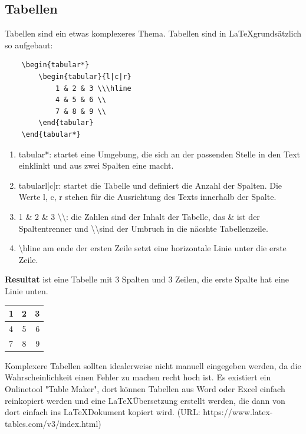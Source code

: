 \documentclass{article}
\begin{document}
\subsection{Tabellen}

Tabellen sind ein etwas komplexeres Thema. Tabellen sind in \LaTeX grundsätzlich so aufgebaut:

\begin{lstlisting}
    \begin{tabular*}
        \begin{tabular}{l|c|r}
            1 & 2 & 3 \\\hline
            4 & 5 & 6 \\
            7 & 8 & 9 \\
        \end{tabular}
    \end{tabular*}
\end{lstlisting}

\begin{enumerate}
    \item {tabular*}: startet eine Umgebung, die sich an der passenden Stelle in den Text einklinkt und aus zwei Spalten eine macht.
    \item {tabular}{l|c|r}: startet die Tabelle und definiert die Anzahl der Spalten. Die Werte l, c, r stehen für die Ausrichtung des Texts innerhalb der Spalte.
    \item 1 \& 2 \& 3 \textbackslash\textbackslash: die Zahlen sind der Inhalt der Tabelle, das \& ist der Spaltentrenner und \textbackslash\textbackslash sind der Umbruch in die näcshte Tabellenzeile.
    \item \textbackslash hline am ende der ersten Zeile setzt eine horizontale Linie unter die erste Zeile.
\end{enumerate}

\textbf{Resultat} ist eine Tabelle mit 3 Spalten und 3 Zeilen, die erste Spalte hat eine Linie unten.  

\vspace{1cm}
    \begin{tabular}{l|c|r}
        1 & 2 & 3 \\\hline
        4 & 5 & 6 \\
        7 & 8 & 9 \\
    \end{tabular}
\vspace{1cm}

Komplexere Tabellen sollten idealerweise nicht manuell eingegeben werden, da die Wahrscheinlichkeit einen Fehler zu machen recht hoch ist. Es existiert ein Onlinetool "Table Maker", dort können Tabellen aus Word oder Excel einfach reinkopiert werden und eine \LaTeX Übersetzung erstellt werden, die dann von dort einfach ins \LaTeX Dokument kopiert wird. (URL: https://www.latex-tables.com/v3/index.html) 
\end{document}
